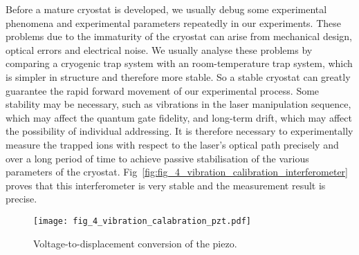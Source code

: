 Before a mature cryostat is developed, we usually debug some experimental phenomena and experimental parameters repeatedly in our experiments. These problems due to the immaturity of the cryostat can arise from mechanical design, optical errors and electrical noise. We usually analyse these problems by comparing a cryogenic trap system with an room-temperature trap system, which is simpler in structure and therefore more stable. So a stable cryostat can greatly guarantee the rapid forward movement of our experimental process. Some stability may be necessary, such as vibrations in the laser manipulation sequence, which may affect the quantum gate fidelity, and long-term drift, which may affect the possibility of individual addressing. It is therefore necessary to experimentally measure the trapped ions with respect to the laser's optical path precisely and over a long period of time to achieve passive stabilisation of the various parameters of the cryostat. Fig~\ref{fig:fig_4_vibration_calibration_interferometer} proves that this interferometer is very stable and the measurement result is precise.

\begin{figure}
    \centering
    \texttt{[image: fig\_4\_vibration\_calabration\_pzt.pdf]}
    \caption{Voltage-to-displacement conversion of the piezo.}
    \label{fig:fig_4_vibration_calabration_pzt}
\end{figure}

